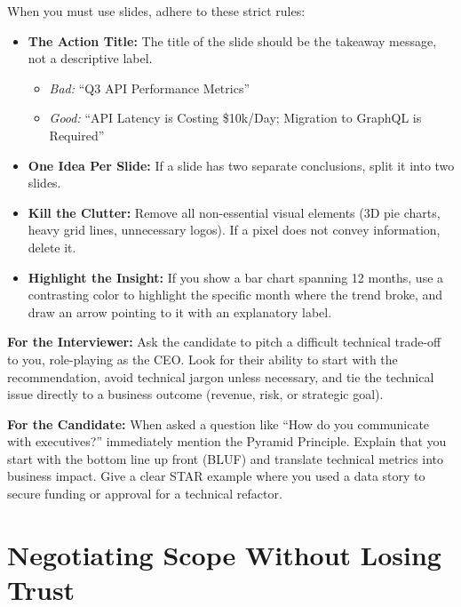 \documentclass[
  11pt,
  openany,
  oneside]{book}
\providecommand{\tightlist}{%
  \setlength{\itemsep}{0pt}\setlength{\parskip}{0pt}}
\renewenvironment{quote}{\begin{customquote}}{\end{customquote}}
\begin{document}
When you must use slides, adhere to these strict rules:

\begin{itemize}
\tightlist
\item
  \textbf{The Action Title:} The title of the slide should be the
  takeaway message, not a descriptive label.

  \begin{itemize}
  \tightlist
  \item
    \emph{Bad:} ``Q3 API Performance Metrics''
  \item
    \emph{Good:} ``API Latency is Costing \$10k/Day; Migration to
    GraphQL is Required''
  \end{itemize}
\item
  \textbf{One Idea Per Slide:} If a slide has two separate conclusions,
  split it into two slides.
\item
  \textbf{Kill the Clutter:} Remove all non-essential visual elements
  (3D pie charts, heavy grid lines, unnecessary logos). If a pixel does
  not convey information, delete it.
\item
  \textbf{Highlight the Insight:} If you show a bar chart spanning 12
  months, use a contrasting color to highlight the specific month where
  the trend broke, and draw an arrow pointing to it with an explanatory
  label.
\end{itemize}

\begin{quote}
\textbf{For the Interviewer:} Ask the candidate to pitch a difficult
technical trade-off to you, role-playing as the CEO. Look for their
ability to start with the recommendation, avoid technical jargon unless
necessary, and tie the technical issue directly to a business outcome
(revenue, risk, or strategic goal).
\end{quote}

\begin{quote}
\textbf{For the Candidate:} When asked a question like ``How do you
communicate with executives?'' immediately mention the Pyramid
Principle. Explain that you start with the bottom line up front (BLUF)
and translate technical metrics into business impact. Give a clear STAR
example where you used a data story to secure funding or approval for a
technical refactor.
\end{quote}

\bigskip

\section{Negotiating Scope Without Losing
Trust}\label{negotiating-scope-without-losing-trust}
\end{document}
